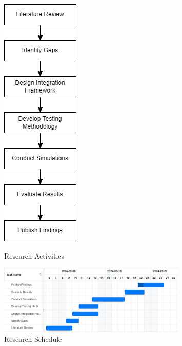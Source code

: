 \documentclass[a4paper, 12pt]{article}
\begin{document}
\begin{figure}[htbp] %
    \centering
    \includegraphics[width=0.2\linewidth]{flowchartresearch.jpg} %
    \caption{Research Activities}
    \label{fig:research_activities} %
    
    \vspace{1cm} %
    
    \includegraphics[width=0.8\textwidth]{ganttresearch.jpg} %
    \caption{Research Schedule}
    \label{fig:research_schedule} %
\end{figure}

\newpage
\end{document}

